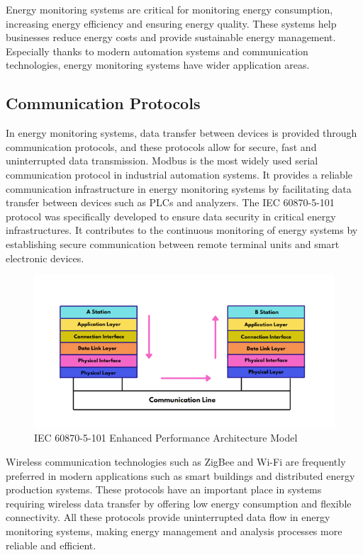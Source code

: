     Energy monitoring systems are critical for monitoring energy consumption, increasing energy efficiency and ensuring energy quality. These systems help businesses reduce energy costs and provide sustainable energy management. Especially thanks to modern automation systems and communication technologies, energy monitoring systems have wider application areas.

    \medskip

    \subsection{Communication Protocols}  

    In energy monitoring systems, data transfer between devices is provided through communication protocols, and these protocols allow for secure, fast and uninterrupted data transmission. Modbus is the most widely used serial communication protocol in industrial automation systems. It provides a reliable communication infrastructure in energy monitoring systems by facilitating data transfer between devices such as PLCs and analyzers. The IEC 60870-5-101 protocol was specifically developed to ensure data security in critical energy infrastructures. It contributes to the continuous monitoring of energy systems by establishing secure communication between remote terminal units and smart electronic devices.


    \begin{figure}[H]
    \centering
    \includegraphics[width=0.8\columnwidth]{imgs/IEC 60870-5-101 Enhanced Performance Architecture Model.png}
    \caption[Short description for list of figures]{IEC 60870-5-101 Enhanced Performance Architecture Model }
    \label{fig-magnitude}
    \end{figure}%

    Wireless communication technologies such as ZigBee and Wi-Fi are frequently preferred in modern applications such as smart buildings and distributed energy production systems. These protocols have an important place in systems requiring wireless data transfer by offering low energy consumption and flexible connectivity. All these protocols provide uninterrupted data flow in energy monitoring systems, making energy management and analysis processes more reliable and efficient.



